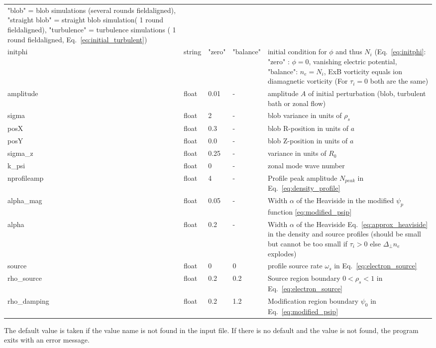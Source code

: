 \begin{longtable}{llll>{\RaggedRight}p{6cm}}
    "blob" = blob simulations (several rounds fieldaligned),
    "straight blob" = straight blob simulation( 1 round fieldaligned),
    "turbulence" = turbulence simulations ( 1 round fieldaligned, Eq.~\eqref{eq:initial_turbulent})\\
initphi   & string & "zero"  & "balance" & initial condition for $\phi$ and thus $N_i$ (Eq.~\eqref{eq:initphi}: "zero" : $\phi = 0$, vanishing
electric potential, "balance": $n_e=N_i$, ExB vorticity equals ion diamagnetic vorticity (For $\tau_i =0 $ both are the same)
\\
amplitude  & float &0.01   & - & amplitude $A$ of initial perturbation (blob, turbulent bath or zonal flow)  \\
sigma      & float &2      & - & blob variance in units of $\rho_s$ \\
posX       & float &0.3    & - & blob R-position in units of $a$\\
posY       & float &0.0    & - & blob Z-position in units of $a$ \\
sigma\_z    & float &0.25   & - & variance in units of $R_0$  \\
k\_psi     & float &0    & - & zonal mode wave number  \\
nprofileamp& float &4   & - & Profile peak amplitude $N_{peak}$ in Eq.~\eqref{eq:density_profile} \\
alpha\_mag   & float & 0.05 & - & Width $\alpha$ of the Heaviside in the modified $\psi_p$ function \eqref{eq:modified_psip}\\
alpha       & float & 0.2 & - & Width $\alpha$ of the Heaviside Eq.~\eqref{eq:approx_heaviside} in the density and source profiles (should be small but cannot be too small if $\tau_i > 0$ else $\Delta_\perp n_e$ explodes) \\
source      & float & 0    & 0 & profile source rate $\omega_s$ in Eq.~\eqref{eq:electron_source} \\
rho\_source & float & 0.2  & 0.2 & Source region boundary $0<\rho_{s}<1$ in Eq.~\eqref{eq:electron_source}  \\
rho\_damping& float & 0.2  & 1.2 & Modification region boundary $\psi_0$ in Eq.~\eqref{eq:modified_psip}  \\
\bottomrule
\end{longtable}
The default value is taken if the value name is not found in the input file. If there is no default and
the value is not found,
the program exits with an error message.
